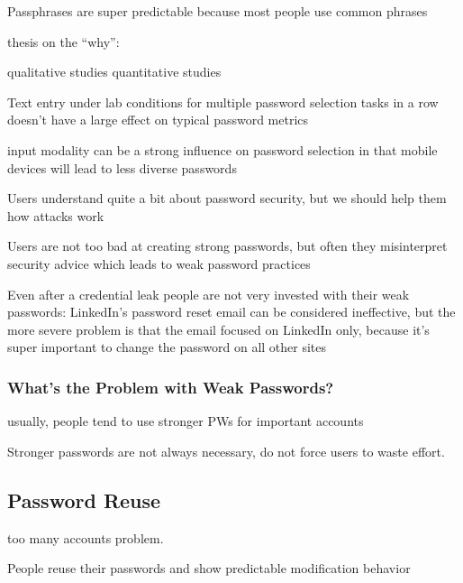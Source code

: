 	Passphrases are super predictable because most people use common phrases \cite{Bonneau2012LinguisticProperties}
	
	\cite{Wang2015ChinesePWs}
	
	thesis on the ``why'': \cite{Notoatmodjo2007ExploringWeakestLink}
	
	qualitative studies \cite{Ur2015PWCreationLab, Stobert2014PasswordLifeCycle} 
	quantitative studies \cite{Ur2016PerceptionsPassword, Seitz2017PASDJO}
	
	
	Text entry under lab conditions for multiple password selection tasks in a row doesn't have a large effect on typical password metrics \cite{Yang2014EntryAffectsPasswordSecurity}
	
	input modality can be a strong influence on password selection in that mobile devices will lead to less diverse passwords \cite{VonZezschwitz2014HoneyIShrunkTheKeys}
	
	Users understand quite a bit about password security, but we should help them how attacks work \cite{Ur2016PerceptionsPassword}
	
	
	Users are not too bad at creating strong passwords, but often they misinterpret security advice which leads to weak password practices \cite{Ur2015PWCreationLab}
	
	Even after a credential leak people are not very invested with their weak passwords: LinkedIn's password reset email can be considered ineffective, but the more severe problem is that the email focused on LinkedIn only, because it's super important to change the password on all other sites \cite{Huh2017TooBusy}
	
	\subsubsection{What's the Problem with Weak Passwords?}
	usually, people tend to use stronger PWs for important accounts
	
	Stronger passwords are not always necessary, do not force users to waste effort. \cite{Florencio2007DoStrongWebPasswords}	
	
	\cite{Shay2014ReligiousAunt}

	\subsection{Password Reuse}
	too many accounts problem.
	
	People reuse their passwords and show predictable modification behavior \cite{Gaw2005ReuseRecycle}
	

